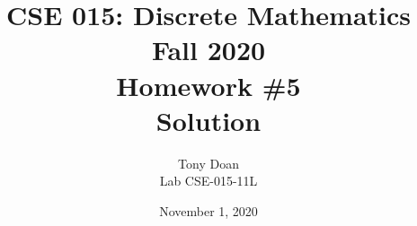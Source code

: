 \documentclass[11pt]{article}
\begin{document}
\author{Tony Doan\\
Lab CSE-015-11L }

\title{CSE 015: Discrete Mathematics\\
Fall 2020\\
Homework \#5\\
Solution}

\date{November 1, 2020}
\maketitle

\end{document}
